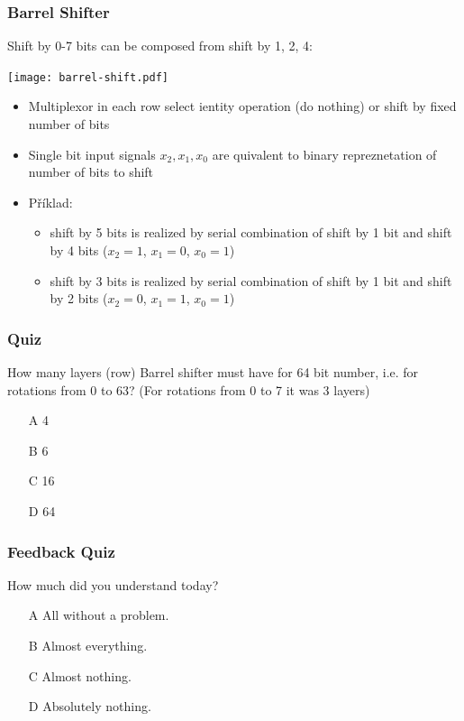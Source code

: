 \documentclass{beamer}
\begin{document}
\begin{frame}
\frametitle{Barrel Shifter}

Shift by 0-7 bits can be composed from shift by 1, 2, 4:
\begin{center}
   \texttt{[image: barrel-shift.pdf]}
\end{center}

\begin{itemize}
\item Multiplexor in each row select ientity operation (do nothing) or shift by fixed number of bits
\item Single bit input signals $x_2,x_1,x_0$ are quivalent to binary repreznetation of number of bits to shift
\item Příklad:
\begin{itemize}
\item shift by 5 bits is realized by serial combination of shift by 1 bit and shift by 4 bits ($x_2=1$, $x_1=0$, $x_0=1$)
\item shift by 3 bits is realized by serial combination of shift by 1 bit and shift by 2 bits ($x_2=0$, $x_1=1$, $x_0=1$)
\end{itemize}
\end{itemize}

\end{frame}


\begin{frame}
\frametitle{Quiz}

How many layers (row) Barrel shifter must have for 64 bit number, i.e. for rotations from 0 to 63? (For rotations from 0 to 7 it was 3 layers)

\begin{itemize}
\item[A] 4
\item[B] 6
\item[C] 16
\item[D] 64
\end{itemize}

\end{frame}


\begin{frame}
\frametitle{Feedback Quiz}

How much did you understand today?
\begin{itemize}
\item[A] All without a problem.
\item[B] Almost everything.
\item[C] Almost nothing.
\item[D] Absolutely nothing.
\end{itemize}

\end{frame}
\end{document}
